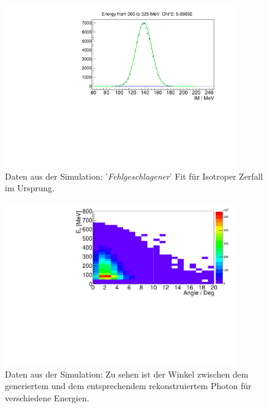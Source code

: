 \documentclass[a4paper,11pt,oneside,final,german,openbib,pdftex]{scrbook}
\begin{document}
{\begin{appendix}
\begin{figure}[h!]
\end{figure}


\begin{figure}[h!]
	\begin{center}
		\includegraphics[width=100mm]{20172804IsotropUrsprungFitFail}
		\end{center}
	\caption[Fehlgeschlagener Fit Isotrop Urspung]{Daten aus der Simulation: '\textit{Fehlgeschlagener}' Fit f\"ur Isotroper Zerfall im Ursprung.}
	\label{fig:Isotrop-Fit-Fail}
\end{figure}



\begin{figure}[h!]
	\begin{center}
		\includegraphics[width=100mm]{AngleRegGen/20171804TrueCandsAngleDeviation}
		\caption[Simulation: Winkel zwischen generiertem und rekonstruiertem Photon]{Daten aus der Simulation: Zu sehen ist der Winkel zwischen dem generiertem und dem entsprechendem rekonstruiertem Photon f\"ur verschiedene Energien.}
		\label{fig:Angle-Rec-Gen-Hist}
	\end{center}
\end{figure}






\end{appendix}}
\end{document}
